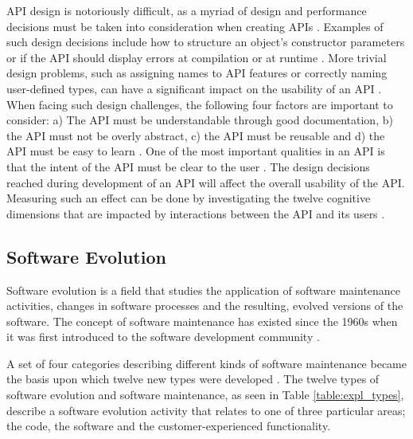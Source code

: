 \documentclass{sig-alternate}
\begin{document}
API design is notoriously difficult, as a myriad of design and performance decisions must be taken into consideration when creating APIs \cite{afonso2012evaluating, bloch2008effective, stylos2006comparing}. Examples of such design decisions include how to structure an object's constructor parameters or if the API should display errors at compilation or at runtime \cite{stylos2006comparing}. More trivial design problems, such as assigning names to API features or correctly naming user-defined types, can have a significant impact on the usability of an API \cite{shi2011empirical}. When facing such design challenges, the following four factors are important to consider: a) The API must be understandable through good documentation, b) the API must not be overly abstract, c) the API must be reusable and d) the API must be easy to learn \cite{shi2011empirical}. One of the most important qualities in an API is that the intent of the API must be clear to the user \cite{shi2011empirical, stylos2006comparing}. The design decisions reached during development of an API will affect the overall usability of the API. Measuring such an effect can be done by investigating the twelve cognitive dimensions that are impacted by interactions between the API and its users \cite{clarke2004measuring}. 


\subsection{Software Evolution} \label{software_evolution}
Software evolution is a field that studies the application of software maintenance activities, changes in software processes and the resulting, evolved versions of the software. The concept of software maintenance has existed since the 1960s when it was first introduced to the software development community \cite{lientz1980software}. 

A set of four categories describing different kinds of software maintenance \cite{lientz1980software} became the basis upon which twelve new types were developed \cite{chapin2001types}. The twelve types of software evolution and software maintenance, as seen in Table \ref{table:expl_types}, describe a software evolution activity that relates to one of three particular areas; the code, the software and the customer-experienced functionality. 
\end{document}
